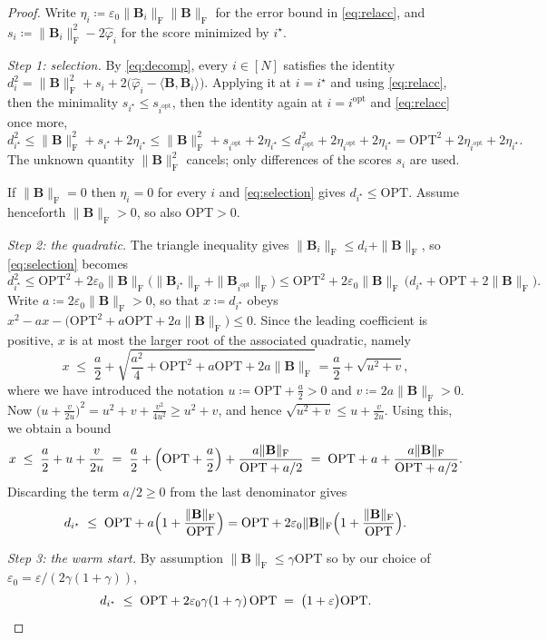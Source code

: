 \documentclass{article}
\renewcommand{\vec}[1]{\mathbf{#1}}          %
\newcommand{\F}{\mathrm{F}}                  %
\newcommand{\eps}{\varepsilon}
\newcommand{\OPT}{\mathrm{OPT}}
\newcommand{\iopt}{i^\mathrm{opt}}
\newcommand{\inner}[2]{\langle #1, #2 \rangle}
\theoremstyle{remark}
\begin{document}
\begin{proof}
Write $\eta_i \coloneqq \eps_0\|\vec{B}_i\|_\F\|\vec{B}\|_\F$ for the error bound in \cref{eq:relacc}, and $s_i \coloneqq \|\vec{B}_i\|_\F^2 - 2\hat{\varphi}_i$ for the score minimized by $i^\star$.

\emph{Step 1: selection.}
By \cref{eq:decomp}, every $i \in [N]$ satisfies the identity $d_i^2 = \|\vec{B}\|_\F^2 + s_i + 2\bigl(\hat{\varphi}_i - \inner{\vec{B}}{\vec{B}_i}\bigr)$.
Applying it at $i = i^\star$ and using \cref{eq:relacc}, then the minimality $s_{i^\star} \le s_{\iopt}$, then the identity again at $i = \iopt$ and \cref{eq:relacc} once more,
\begin{equation}\label{eq:selection}
d_{i^\star}^2
\le \|\vec{B}\|_\F^2 + s_{i^\star} + 2\eta_{i^\star}
\le \|\vec{B}\|_\F^2 + s_{\iopt} + 2\eta_{i^\star}
\le d_{\iopt}^2 + 2\eta_{\iopt} + 2\eta_{i^\star}
= \OPT^2 + 2\eta_{\iopt} + 2\eta_{i^\star} .
\end{equation}
The unknown quantity $\|\vec{B}\|_\F^2$ cancels; only differences of the scores $s_i$ are used.

If $\|\vec{B}\|_\F = 0$ then $\eta_i = 0$ for every $i$ and \cref{eq:selection} gives $d_{i^\star} \le \OPT$.
Assume henceforth $\|\vec{B}\|_\F > 0$, so also $\OPT > 0$.

\emph{Step 2: the quadratic.}
The triangle inequality gives $\|\vec{B}_i\|_\F \le d_i + \|\vec{B}\|_\F$, so \cref{eq:selection} becomes
\[
d_{i^\star}^2
\le \OPT^2 + 2\eps_0 \|\vec{B}\|_\F \bigl( \|\vec{B}_{i^\star}\|_\F + \|\vec{B}_{\iopt}\|_\F \bigr)
\le \OPT^2 + 2\eps_0\|\vec{B}\|_\F\,\bigl( d_{i^\star} + \OPT + 2\|\vec{B}\|_\F \bigr).
\]
Write $a \coloneqq 2\eps_0\|\vec{B}\|_\F > 0$, so that $x \coloneqq d_{i^\star}$ obeys $x^2 - a x - \bigl( \OPT^2 + a\OPT + 2a\|\vec{B}\|_\F \bigr) \le 0$.
Since the leading coefficient is positive, $x$ is at most the larger root of the associated quadratic, namely
\[
x \;\le\; \frac{a}{2} + \sqrt{ \frac{a^2}{4} + \OPT^2 + a\OPT + 2a\|\vec{B}\|_\F } 
= \frac{a}{2} + \sqrt{u^2+v},
\]
where we have introduced the notation $u \coloneqq \OPT + \tfrac{a}{2} > 0$ and $v \coloneqq 2 a \|\vec{B}\|_\F > 0$.
Now $\bigl( u + \tfrac{v}{2u} \bigr)^2 = u^2 + v + \tfrac{v^2}{4u^2} \ge u^2 + v$, and hence $\sqrt{u^2 + v} \le u + \tfrac{v}{2u}$.
Using this, we obtain a bound
\[
x \;\le\; \frac{a}{2} + u + \frac{v}{2u}
\;=\; \frac{a}{2} + \Bigl( \OPT + \frac{a}{2} \Bigr) + \frac{a\|\vec{B}\|_\F}{\OPT + a/2}
\;=\; \OPT + a + \frac{a\|\vec{B}\|_\F}{\OPT + a/2} .
\]
Discarding the term $a/2 \ge 0$ from the last denominator gives
\begin{equation}\label{eq:pivotfree}
d_{i^\star} \;\le\; \OPT + a\Bigl( 1 + \frac{\|\vec{B}\|_\F}{\OPT} \Bigr)
= \OPT + 2\eps_0 \|\vec{B}\|_\F \Bigl( 1 + \frac{\|\vec{B}\|_\F}{\OPT} \Bigr).
\end{equation}

\emph{Step 3: the warm start.}
By assumption $\|\vec{B}\|_\F \le \gamma\OPT$ so by our choice of $\eps_0 = \eps / (2\gamma(1+\gamma))$,
\[
d_{i^\star} \;\le\; \OPT + 2\eps_0\gamma(1+\gamma)\,\OPT \;=\; \bigl(1 + \eps \bigr)\OPT . \qedhere
\]
\end{proof}
\end{document}
